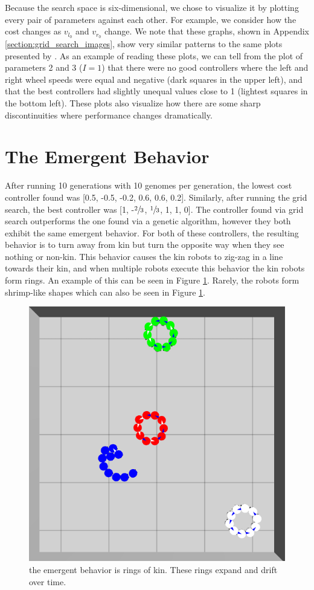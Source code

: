 \documentclass[conference]{IEEEtran}
\begin{document}
    Because the search space is six-dimensional, we chose to visualize it by plotting every pair of parameters against each other. For example, we consider how the cost changes as $v_{l_0}$ and $v_{r_0}$ change. We note that these graphs, shown in Appendix \ref{section:grid_search_images}, show very similar patterns to the same plots presented by \cite{gauci_self-organized_2014}. As an example of reading these plots, we can tell from the plot of parameters 2 and 3 ($I=1$) that there were no good controllers where the left and right wheel speeds were equal and negative (dark squares in the upper left), and that the best controllers had slightly unequal values close to 1 (lightest squares in the bottom left). These plots also visualize how there are some sharp discontinuities where performance changes dramatically.

\section{The Emergent Behavior}

    After running 10 generations with 10 genomes per generation, the lowest cost controller found was [0.5, -0.5, -0.2, 0.6, 0.6, 0.2]. Similarly, after running the grid search, the best controller was [1, -$\sfrac{2}{3}$, $\sfrac{1}{3}$, 1, 1, 0]. The controller found via grid search outperforms the one found via a genetic algorithm, however they both exhibit the same emergent behavior. For both of these controllers, the resulting behavior is to turn away from kin but turn the opposite way when they see nothing or non-kin. This behavior causes the kin robots to zig-zag in a line towards their kin, and when multiple robots execute this behavior the kin robots form rings. An example of this can be seen in Figure \ref{fig:rings}. Rarely, the robots form shrimp-like shapes which can also be seen in Figure \ref{fig:rings}.

    \begin{figure}
      \centering
      \includegraphics[width=0.7\linewidth]{./images/rings_example.png}
      \caption{the emergent behavior is rings of kin. These rings expand and drift over time.}
      \label{fig:rings}
    \end{figure}
\end{document}
